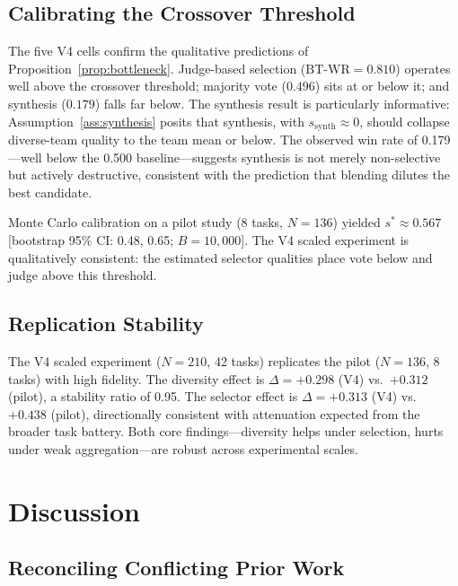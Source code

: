 \documentclass[10pt,twocolumn]{article}
\theoremstyle{remark}
\begin{document}
\subsection{Calibrating the Crossover Threshold}
\label{sec:calibration}

The five V4 cells confirm the qualitative predictions of Proposition~\ref{prop:bottleneck}. Judge-based selection ($\mathrm{BT\text{-}WR} = 0.810$) operates well above the crossover threshold; majority vote ($0.496$) sits at or below it; and synthesis ($0.179$) falls far below. The synthesis result is particularly informative: Assumption~\ref{ass:synthesis} posits that synthesis, with $s_\mathrm{synth} \approx 0$, should collapse diverse-team quality to the team mean or below. The observed win rate of 0.179---well below the 0.500 baseline---suggests synthesis is not merely non-selective but actively destructive, consistent with the prediction that blending dilutes the best candidate.

Monte Carlo calibration on a pilot study (8 tasks, $N = 136$) yielded $s^* \approx 0.567$ [bootstrap 95\% CI: 0.48, 0.65; $B = 10{,}000$]. The V4 scaled experiment is qualitatively consistent: the estimated selector qualities place vote below and judge above this threshold.

\subsection{Replication Stability}

The V4 scaled experiment ($N = 210$, 42 tasks) replicates the pilot ($N = 136$, 8 tasks) with high fidelity. The diversity effect is $\Delta = +0.298$ (V4) vs.\ $+0.312$ (pilot), a stability ratio of 0.95. The selector effect is $\Delta = +0.313$ (V4) vs.\ $+0.438$ (pilot), directionally consistent with attenuation expected from the broader task battery. Both core findings---diversity helps under selection, hurts under weak aggregation---are robust across experimental scales.

\section{Discussion}
\label{sec:discussion}

\subsection{Reconciling Conflicting Prior Work}
\label{sec:reconciling}
\end{document}
